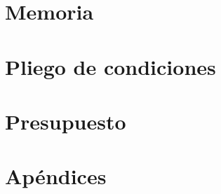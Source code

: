 \documentclass[12pt,titlepage,openright]{report}
\begin{document}
\renewcommand\listtablename{Índice de tablas}
\renewcommand\tablename{Tabla}



 \tableofcontents \newpage \listoffigures
\newpage \listoftables \newpage {}


\cleardoublepage

\part{Memoria}









\cleardoublepage

\part{Pliego de condiciones}

\cleardoublepage

\part{Presupuesto}

\cleardoublepage

\part{Apéndices}
\appendix

\cleardoublepage

\cleardoublepage

\cleardoublepage

\cleardoublepage

\cleardoublepage



\end{document}
